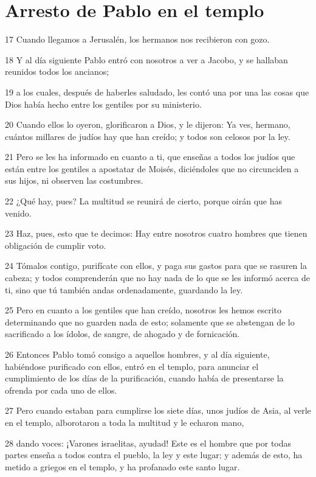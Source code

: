 \section*{Arresto de Pablo en el templo}

\par 17 Cuando llegamos a Jerusalén, los hermanos nos recibieron con gozo.
\par 18 Y al día siguiente Pablo entró con nosotros a ver a Jacobo, y se hallaban reunidos todos los ancianos;
\par 19 a los cuales, después de haberles saludado, les contó una por una las cosas que Dios había hecho entre los gentiles por su ministerio.
\par 20 Cuando ellos lo oyeron, glorificaron a Dios, y le dijeron: Ya ves, hermano, cuántos millares de judíos hay que han creído; y todos son celosos por la ley.
\par 21 Pero se les ha informado en cuanto a ti, que enseñas a todos los judíos que están entre los gentiles a apostatar de Moisés, diciéndoles que no circunciden a sus hijos, ni observen las costumbres.
\par 22 ¿Qué hay, pues? La multitud se reunirá de cierto, porque oirán que has venido.
\par 23 Haz, pues, esto que te decimos: Hay entre nosotros cuatro hombres que tienen obligación de cumplir voto.
\par 24 Tómalos contigo, purifícate con ellos, y paga sus gastos para que se rasuren la cabeza; y todos comprenderán que no hay nada de lo que se les informó acerca de ti, sino que tú también andas ordenadamente, guardando la ley.
\par 25 Pero en cuanto a los gentiles que han creído, nosotros les hemos escrito determinando que no guarden nada de esto; solamente que se abstengan de lo sacrificado a los ídolos, de sangre, de ahogado y de fornicación.
\par 26 Entonces Pablo tomó consigo a aquellos hombres, y al día siguiente, habiéndose purificado con ellos, entró en el templo, para anunciar el cumplimiento de los días de la purificación, cuando había de presentarse la ofrenda por cada uno de ellos.
\par 27 Pero cuando estaban para cumplirse los siete días, unos judíos de Asia, al verle en el templo, alborotaron a toda la multitud y le echaron mano,
\par 28 dando voces: ¡Varones israelitas, ayudad! Este es el hombre que por todas partes enseña a todos contra el pueblo, la ley y este lugar; y además de esto, ha metido a griegos en el templo, y ha profanado este santo lugar.
